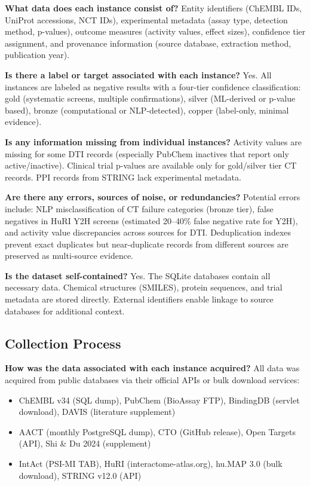 \textbf{What data does each instance consist of?}
Entity identifiers (ChEMBL IDs, UniProt accessions, NCT IDs), experimental metadata (assay type, detection method, p-values), outcome measures (activity values, effect sizes), confidence tier assignment, and provenance information (source database, extraction method, publication year).

\textbf{Is there a label or target associated with each instance?}
Yes. All instances are labeled as negative results with a four-tier confidence classification: gold (systematic screens, multiple confirmations), silver (ML-derived or p-value based), bronze (computational or NLP-detected), copper (label-only, minimal evidence).

\textbf{Is any information missing from individual instances?}
Activity values are missing for some DTI records (especially PubChem inactives that report only active/inactive). Clinical trial p-values are available only for gold/silver tier CT records. PPI records from STRING lack experimental metadata.

\textbf{Are there any errors, sources of noise, or redundancies?}
Potential errors include: NLP misclassification of CT failure categories (bronze tier), false negatives in HuRI Y2H screens (estimated 20--40\% false negative rate for Y2H), and activity value discrepancies across sources for DTI. Deduplication indexes prevent exact duplicates but near-duplicate records from different sources are preserved as multi-source evidence.

\textbf{Is the dataset self-contained?}
Yes. The SQLite databases contain all necessary data. Chemical structures (SMILES), protein sequences, and trial metadata are stored directly. External identifiers enable linkage to source databases for additional context.

\subsection{Collection Process}

\textbf{How was the data associated with each instance acquired?}
All data was acquired from public databases via their official APIs or bulk download services:
\begin{itemize}[nosep,leftmargin=*]
    \item ChEMBL v34 (SQL dump), PubChem (BioAssay FTP), BindingDB (servlet download), DAVIS (literature supplement)
    \item AACT (monthly PostgreSQL dump), CTO (GitHub release), Open Targets (API), Shi \& Du 2024 (supplement)
    \item IntAct (PSI-MI TAB), HuRI (interactome-atlas.org), hu.MAP 3.0 (bulk download), STRING v12.0 (API)
\end{itemize}

